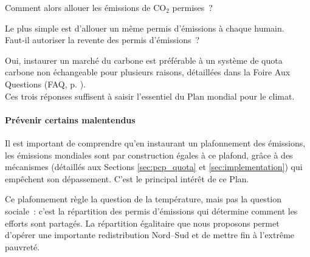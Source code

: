 \documentclass[a5paper,french,openany]{memoir}
\begin{document}
Comment alors allouer les émissions de CO$_\text{2}$ permises~? 

Le plus simple %
est d'allouer un même permis d'émissions à chaque humain. \\

Faut-il autoriser la revente des permis d'émissions~? 

Oui, %
instaurer un marché du carbone est préférable à un système de quota carbone non échangeable pour plusieurs raisons, détaillées dans la Foire Aux Questions (FAQ, p. \pageref{q:rationnement}).\\ %

Ces trois réponses suffisent à saisir l'essentiel du Plan mondial pour le climat.

\paragraph{Prévenir certains malentendus}
Il est important de comprendre qu'en instaurant un plafonnement des émissions, les émissions mondiales sont par construction égales à ce plafond, grâce à des mécanismes (détaillés aux Sections \ref{sec:pcp_quota} et \ref{sec:implementation}) qui empêchent son dépassement. C'est le principal intérêt de ce Plan.

Ce plafonnement règle la question de la température, %
mais pas la question sociale~: c'est la répartition des permis d'émissions qui détermine comment les efforts sont partagés. La répartition égalitaire que nous proposons permet d'opérer une importante redistribution Nord--Sud et de mettre fin à l'extrême pauvreté. 
\end{document}
